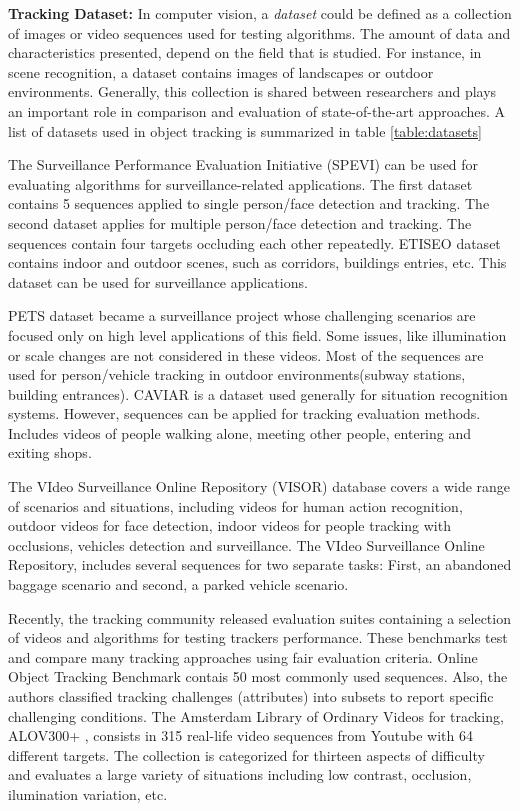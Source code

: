 \textbf{Tracking Dataset: } In computer vision, a \textit{dataset} could be
defined as a collection of
images or video sequences used for testing algorithms. The amount of data and
characteristics presented, depend on the field that is studied.
For instance, in scene recognition, a dataset contains images of landscapes or
outdoor environments. Generally, this collection is shared between researchers
and plays an important role in comparison and evaluation of state-of-the-art
approaches. A list of datasets used in object tracking is summarized in table
\ref{table:datasets}

The Surveillance Performance Evaluation Initiative (SPEVI) \cite{Maggio2005}
can be used for evaluating algorithms for surveillance-related applications. The
first dataset contains 5 sequences applied to single person/face detection and
tracking. The second dataset applies for multiple person/face detection and
tracking. The sequences contain four targets occluding each other repeatedly.
ETISEO dataset \cite{Munder2006} contains indoor and outdoor scenes, such as
corridors, buildings entries, etc. This dataset can be used for surveillance
applications.

PETS dataset \cite{PETS} became a surveillance project whose challenging
scenarios are focused only on high level applications of this field. Some
issues, like illumination or scale changes are not considered in these videos.
Most of the sequences are used for person/vehicle tracking in outdoor
environments(subway stations, building entrances). CAVIAR \cite{Torralba2003}
is a dataset used generally for situation recognition systems. However,
sequences can be applied for tracking evaluation methods. Includes videos of
people walking alone, meeting other people, entering and exiting shops.

The VIdeo Surveillance Online Repository (VISOR) \cite{Vezzani2010} database
covers a wide range of scenarios and situations, including videos for human
action recognition, outdoor videos for face detection, indoor videos for people
tracking with occlusions, vehicles detection and surveillance. The VIdeo
Surveillance Online Repository, includes several sequences for two separate
tasks: First, an abandoned baggage scenario and second, a parked vehicle
scenario.

Recently, the tracking community released evaluation suites containing a
selection of videos and algorithms for testing trackers performance. These
benchmarks test and compare many tracking approaches using fair evaluation
criteria. Online Object Tracking Benchmark \cite{Wu2013B} contais 50 most
commonly used sequences. Also, the authors classified tracking challenges
(attributes) into subsets to report specific challenging conditions. The
Amsterdam Library of Ordinary Videos for tracking, ALOV300+ \cite{Smeulders2014},
consists in 315 real-life video sequences from Youtube with 64 different
targets. The collection is categorized for thirteen aspects of difficulty and
evaluates a large variety of situations including low contrast, occlusion,
ilumination variation, etc.

